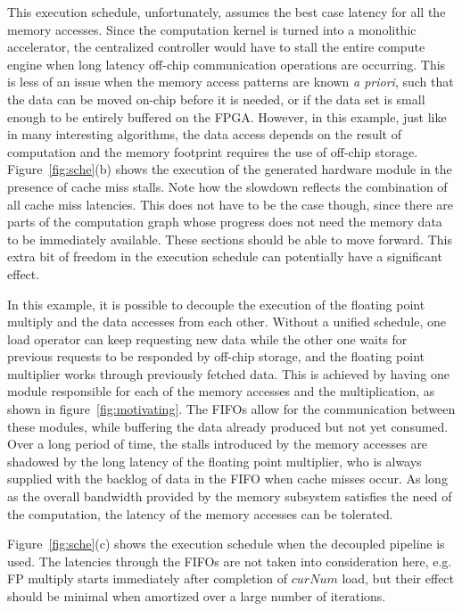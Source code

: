 This execution schedule, unfortunately, assumes the best case latency for all the memory accesses. Since the computation kernel is turned into a monolithic accelerator,
the centralized controller would have to stall the entire compute engine when long latency off-chip communication operations are occurring. This is less of an issue when the memory access patterns are known \textit{a priori}, such that the data can be moved on-chip before
it is needed, or if the data set is small enough to be entirely buffered on the FPGA.
However, in this example, just like in many interesting algorithms, the data access depends on the result of computation and the memory footprint requires the use of off-chip storage. Figure~\ref{fig:sche}(b) shows the execution of the generated hardware module
in the presence of cache miss stalls. Note how the slowdown reflects the combination
of all cache miss latencies. This does not have to be the case though, since there are
parts of the computation graph whose progress does not need the memory data to be immediately available. These sections should be able to move forward. This extra bit of
freedom in the execution schedule can potentially have a significant effect.

In this example, it is possible to decouple the execution of the floating point multiply and the data accesses from each other. Without a unified schedule, one load operator can keep requesting new data while the other one waits for previous requests to be responded by off-chip storage, and the floating point multiplier works through
previously fetched data. This is achieved by having one module responsible for each
of the memory accesses and the multiplication, as shown in figure~\ref{fig:motivating}.
The FIFOs allow for the communication between these modules, while buffering the data
already produced but not yet consumed. Over a long period of time, the stalls introduced by the memory accesses are shadowed by the long latency of the floating point multiplier, who is always supplied with the backlog of data in the FIFO when
cache misses occur. As long as the overall bandwidth provided by the memory subsystem
satisfies the need of the computation, the latency of the memory accesses can be
tolerated. 

Figure~\ref{fig:sche}(c) shows the execution schedule when the decoupled pipeline is used. The latencies through the FIFOs are not taken into consideration here, e.g. FP multiply starts immediately after completion of $curNum$ load, but their effect
should be minimal when amortized over a large number of iterations. 


